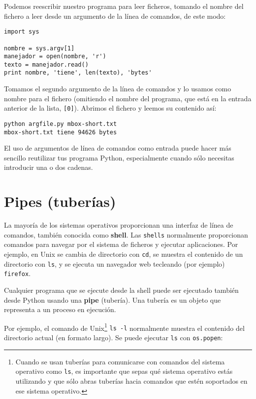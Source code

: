 Podemos reescribir nuestro programa para leer ficheros, tomando el nombre del fichero
a leer desde un argumento de la línea de comandos, de este modo:

\beforeverb
\begin{verbatim}
import sys

nombre = sys.argv[1]
manejador = open(nombre, 'r')
texto = manejador.read()
print nombre, 'tiene', len(texto), 'bytes'
\end{verbatim}
\afterverb
%
Tomamos el segundo argumento de la línea de comandos y lo usamos como nombre para el fichero
(omitiendo el nombre del programa, que está en la entrada anterior de la lista, {\tt [0]}).
Abrimos el fichero y leemos su contenido así:

\beforeverb
\begin{verbatim}
python argfile.py mbox-short.txt
mbox-short.txt tiene 94626 bytes
\end{verbatim}
\afterverb
%
El uso de argumentos de línea de comandos como entrada puede hacer más sencillo reutilizar tus
programa Python, especialmente cuando sólo necesitas introducir una o dos cadenas.

\section{Pipes (tuberías)}


La mayoría de los sistemas operativos proporcionan una interfaz de línea de comandos,
también conocida como {\bf shell}. Las {\tt shells} normalmente proporcionan comandos
para navegar por el sistema de ficheros y ejecutar aplicaciones. Por
ejemplo, en Unix se cambia de directorio con {\tt cd},
se muestra el contenido de un directorio con {\tt ls}, y se ejecuta
un navegador web tecleando (por ejemplo) {\tt firefox}.


Cualquier programa que se ejecute desde la shell puede ser ejecutado
también desde Python usando una {\bf pipe} (tubería). Una tubería es un objeto
que representa a un proceso en ejecución.

Por ejemplo, el comando de Unix\footnote{Cuando se usan tuberías para comunicarse
con comandos del sistema operativo como {\tt ls}, es importante
que sepas qué sistema operativo estás utilizando y que sólo abras
tuberías hacia comandos que estén soportados en ese sistema operativo.}
{\tt ls -l} normalmente muestra el
contenido del directorio actual (en formato largo). Se puede
ejecutar {\tt ls} con {\tt os.popen}:

